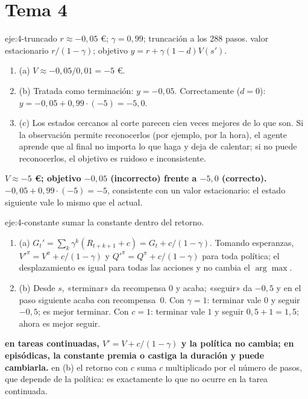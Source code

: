 \section{Tema 4}

\begin{solucion}{eje:4-truncado}
\datos $r\approx-0{,}05$ €; $\gamma=0{,}99$; truncación a los 288 pasos.
\planteamiento valor estacionario $r/(1-\gamma)$; objetivo $y=r+\gamma(1-d)V(s')$.
\pasos
\begin{enumerate}[label=\arabic*.]
  \item (a) $V\approx-0{,}05/0{,}01=-5$ €.
  \item (b) Tratada como terminación: $y=-0{,}05$. Correctamente ($d=0$): $y=-0{,}05+0{,}99\cdot(-5)=-5{,}0$.
  \item (c) Los estados cercanos al corte parecen cien veces mejores de lo que son. Si la observación permite reconocerlos (por ejemplo, por la hora), el agente aprende que al final no importa lo que haga y deja de calentar; si no puede reconocerlos, el objetivo es ruidoso e inconsistente.
\end{enumerate}
\resultado \textbf{$V\approx-5$ €; objetivo $-0{,}05$ (incorrecto) frente a $-5{,}0$ (correcto).}
\comprobacion $-0{,}05+0{,}99\cdot(-5)=-5$, consistente con un valor estacionario: el estado siguiente vale lo mismo que el actual.
\end{solucion}

\begin{solucion}{eje:4-constante}
\planteamiento sumar la constante dentro del retorno.
\pasos
\begin{enumerate}[label=\arabic*.]
  \item (a) $G_t'=\sum_k\gamma^{k}(R_{t+k+1}+c)=G_t+c/(1-\gamma)$. Tomando esperanzas, $V'^{\pi}=V^{\pi}+c/(1-\gamma)$ y $Q'^{\pi}=Q^{\pi}+c/(1-\gamma)$ para toda política; el desplazamiento es igual para todas las acciones y no cambia el $\arg\max$.
  \item (b) Desde $s$, «terminar» da recompensa $0$ y acaba; «seguir» da $-0{,}5$ y en el paso siguiente acaba con recompensa~$0$. Con $\gamma=1$: terminar vale $0$ y seguir $-0{,}5$; es mejor terminar. Con $c=1$: terminar vale $1$ y seguir $0{,}5+1=1{,}5$; ahora es mejor seguir.
\end{enumerate}
\resultado \textbf{en tareas continuadas, $V'=V+c/(1-\gamma)$ y la política no cambia; en episódicas, la constante premia o castiga la duración y puede cambiarla.}
\comprobacion en (b) el retorno con $c$ suma $c$ multiplicado por el número de pasos, que depende de la política: es exactamente lo que no ocurre en la tarea continuada.
\end{solucion}

